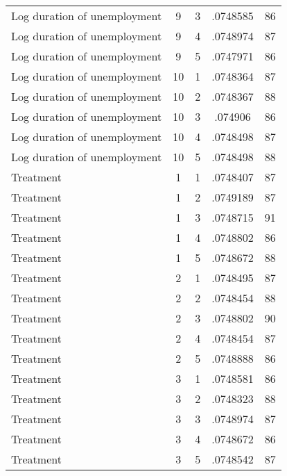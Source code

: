 \begin{tabular}{l*{4}{c}}
Log duration of unemployment&           9&           3&    .0748585&          86\\
Log duration of unemployment&           9&           4&    .0748974&          87\\
Log duration of unemployment&           9&           5&    .0747971&          86\\
Log duration of unemployment&          10&           1&    .0748364&          87\\
Log duration of unemployment&          10&           2&    .0748367&          88\\
Log duration of unemployment&          10&           3&     .074906&          86\\
Log duration of unemployment&          10&           4&    .0748498&          87\\
Log duration of unemployment&          10&           5&    .0748498&          88\\
Treatment           &           1&           1&    .0748407&          87\\
Treatment           &           1&           2&    .0749189&          87\\
Treatment           &           1&           3&    .0748715&          91\\
Treatment           &           1&           4&    .0748802&          86\\
Treatment           &           1&           5&    .0748672&          88\\
Treatment           &           2&           1&    .0748495&          87\\
Treatment           &           2&           2&    .0748454&          88\\
Treatment           &           2&           3&    .0748802&          90\\
Treatment           &           2&           4&    .0748454&          87\\
Treatment           &           2&           5&    .0748888&          86\\
Treatment           &           3&           1&    .0748581&          86\\
Treatment           &           3&           2&    .0748323&          88\\
Treatment           &           3&           3&    .0748974&          87\\
Treatment           &           3&           4&    .0748672&          86\\
Treatment           &           3&           5&    .0748542&          87\\

\end{tabular}
